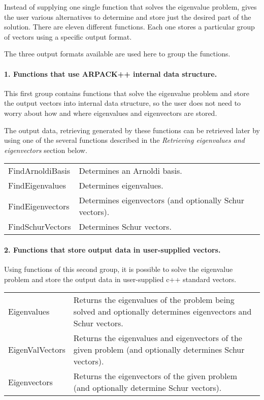 Instead of supplying one single function that solves the eigenvalue problem, \ARPP{} gives the user various alternatives to determine and store just the desired part of the solution. There are eleven different functions. Each one stores a particular group of vectors using a specific output format.

The three output formats available are used here to group the functions.

\paragraph{1. Functions that use ARPACK++ internal data structure.}

This first group contains functions that solve the eigenvalue problem and store the output vectors into \ARPP{} internal data structure, so the user does not need to worry about how and where eigenvalues and eigenvectors are stored. 

The output data, retrieving generated by these functions can be retrieved later by using one of the several functions described in the \textit{Retrieving eigenvalues and eigenvectors} section below.

\begin{tabularx}{\textwidth}{LX}
	FindArnoldiBasis & Determines an Arnoldi basis.\\
	FindEigenvalues & Determines eigenvalues.\\
	FindEigenvectors & Determines eigenvectors (and optionally Schur vectors).\\
	FindSchurVectors & Determines Schur vectors.\\
\end{tabularx}

\paragraph{2. Functions that store output data in user-supplied vectors.}

Using functions of this second group, it is possible to solve the eigenvalue problem and store the output data in user-supplied c++ standard vectors. 

\begin{tabularx}{\textwidth}{LX}
	Eigenvalues & Returns the eigenvalues of the problem being solved and optionally determines eigenvectors and Schur vectors.\\
	EigenValVectors & Returns the eigenvalues and eigenvectors of the given problem (and optionally determines Schur vectors).\\
	Eigenvectors & Returns the eigenvectors of the given problem (and optionally determine Schur vectors).\\
\end{tabularx}

